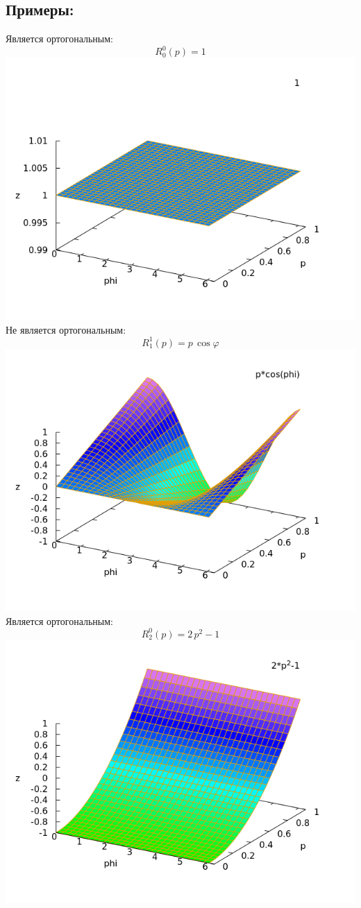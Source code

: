\documentclass[pdf, unicode, 12pt, a4paper,oneside,fleqn]{article}
\begin{document}
\subsection*{Примеры:}
Является ортогональным:$$R^{0}_{0}(p) = 1$$
\includegraphics[scale=0.5]{./graph1.png}\\
Не является ортогональным:$$R^{1}_{1}(p) = p\,\cos \varphi$$
\includegraphics[scale=0.5]{./graph2.png}\\
Является ортогональным:$$R^{0}_{2}(p) = 2\,p^2-1$$
\includegraphics[scale=0.5]{./graph3.png}\\
\end{document}
